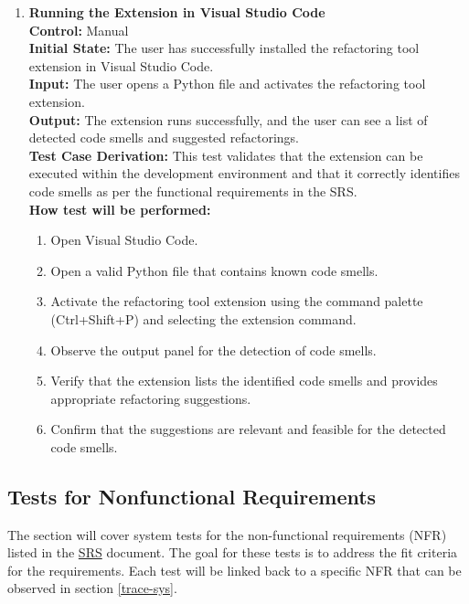 \documentclass[12pt, titlepage]{article}
\newcommand{\SRS}{\href{https://github.com/ssm-lab/capstone--source-code-optimizer/blob/main/docs/SRS/SRS.pdf}{SRS}}
\begin{document}
\begin{enumerate}[label={\bf
    \textcolor{Maroon}{test-FR-IE-\arabic*}}, wide=0pt, font=\itshape]
  \item \textbf{Running the Extension in Visual Studio Code}\\[2mm]
    \textbf{Control:} Manual\\
    \textbf{Initial State:} The user has successfully installed the
    refactoring tool extension in Visual Studio Code.\\
    \textbf{Input:} The user opens a Python file and activates the
    refactoring tool extension.\\
    \textbf{Output:} The extension runs successfully, and the user
    can see a list of detected code smells and suggested refactorings.\\[2mm]
    \textbf{Test Case Derivation:} This test validates that the
    extension can be executed within the development environment and
    that it correctly identifies code smells as per the functional
    requirements in the SRS.\\[2mm]
    \textbf{How test will be performed:}
    \begin{enumerate}[label=\arabic*.]
      \item Open Visual Studio Code.
      \item Open a valid Python file that contains known code smells.
      \item Activate the refactoring tool extension using the command
        palette (Ctrl+Shift+P) and selecting the extension command.
      \item Observe the output panel for the detection of code smells.
      \item Verify that the extension lists the identified code
        smells and provides appropriate refactoring suggestions.
      \item Confirm that the suggestions are relevant and feasible
        for the detected code smells.
    \end{enumerate}
\end{enumerate}

\subsection{Tests for Nonfunctional Requirements}

The section will cover system tests for the non-functional
requirements (NFR) listed in the \SRS \hspace{1pt}
document\cite{SRS}. The goal for these tests is to address the fit
criteria for the requirements. Each test will be linked back to a
specific NFR that can be observed in section \ref{trace-sys}.
\end{document}
